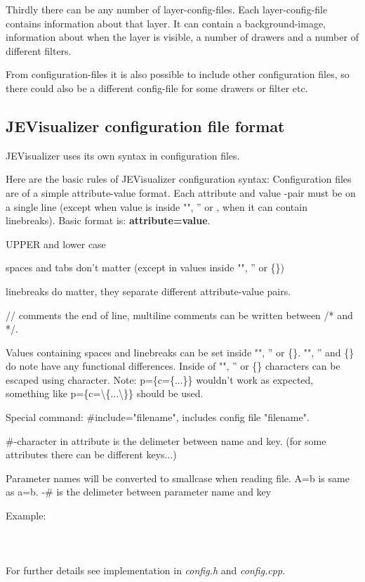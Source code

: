 \documentclass{article}
\begin{document}
    Thirdly there can be any number of layer-config-files. Each layer-config-file contains information about that layer. It can contain
    a background-image, information about when the layer is visible, a number of drawers and a number of different filters.
    
    From configuration-files it is also possible to include other configuration files, so there could also be a different config-file for some drawers or filter etc.
    
    \subsection{JEVisualizer configuration file format}
      JEVisualizer uses its own syntax in configuration files.
      
      Here are the basic rules of JEVisualizer configuration syntax:
      Configuration files are of a simple attribute-value format. Each attribute and value -pair must be on a single line (except when
      value is inside "", '' or {}, when it can contain linebreaks). Basic format is: \textbf{attribute=value}.
      
      \begin{labeling}{UPPER and lower case}
        \item [spaces and tabs]       spaces and tabs don't matter (except in values inside "", '' or \{\})
        \item [linebreaks]            linebreaks do matter, they separate different attribute-value pairs.
        \item [commenting]            // comments the end of line, multiline comments can be written between /* and */.
        \item ["", '' and {}]         Values containing spaces and linebreaks can be set inside "", '' or \{\}. "", '' and \{\} do note
                                      have any functional differences. Inside of "", '' or \{\} characters can be escaped using \-character.
                                      Note: p=\{c=\{...\}\} wouldn't work as expected, something like p=\{c=\textbackslash\{...\textbackslash\}\} should be used.
        \item [including other files] Special command: \#include="filename", includes config file "filename".
        \item [\#-character]          \#-character in attribute is the delimeter between name and key. (for some attributes there can
                                      be different keys...)
        \item [UPPER and lower case]  Parameter names will be converted to smallcase when reading file. A=b is same as a=b.
      -\# is the delimeter between parameter name and key 
      \end{labeling}
      Example: \\ \\
       \\ \\
      For further details see implementation in \textit{config.h} and \textit{config.cpp}.
\end{document}
